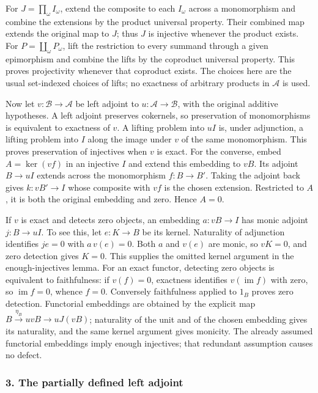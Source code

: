 \documentclass[11pt]{article}
\begin{document}
For \(J=\prod_\omega I_\omega\), extend the composite to each \(I_\omega\) across a monomorphism and combine the extensions by the product universal property. Their combined map extends the original map to \(J\); thus \(J\) is injective whenever the product exists. For \(P=\coprod_\omega P_\omega\), lift the restriction to every summand through a given epimorphism and combine the lifts by the coproduct universal property. This proves projectivity whenever that coproduct exists. The choices here are the usual set-indexed choices of lifts; no exactness of arbitrary products in \(\mathcal A\) is used.

Now let \(v:\mathcal B\to\mathcal A\) be left adjoint to \(u:\mathcal A\to\mathcal B\), with the original additive hypotheses. A left adjoint preserves cokernels, so preservation of monomorphisms is equivalent to exactness of \(v\). A lifting problem into \(uI\) is, under adjunction, a lifting problem into \(I\) along the image under \(v\) of the same monomorphism. This proves preservation of injectives when \(v\) is exact. For the converse, embed \(A=\ker(vf)\) in an injective \(I\) and extend this embedding to \(vB\). Its adjoint \(B\to uI\) extends across the monomorphism \(f:B\to B'\). Taking the adjoint back gives \(k:vB'\to I\) whose composite with \(vf\) is the chosen extension. Restricted to \(A\), it is both the original embedding and zero. Hence \(A=0\).

If \(v\) is exact and detects zero objects, an embedding \(a:vB\to I\) has monic adjoint \(j:B\to uI\). To see this, let \(e:K\to B\) be its kernel. Naturality of adjunction identifies \(je=0\) with \(a\,v(e)=0\). Both \(a\) and \(v(e)\) are monic, so \(vK=0\), and zero detection gives \(K=0\). This supplies the omitted kernel argument in the enough-injectives lemma. For an exact functor, detecting zero objects is equivalent to faithfulness: if \(v(f)=0\), exactness identifies \(v(\operatorname{im}f)\) with zero, so \(\operatorname{im}f=0\), whence \(f=0\). Conversely faithfulness applied to \(1_B\) proves zero detection. Functorial embeddings are obtained by the explicit map \(B\xrightarrow{\eta_B}uvB\to uJ(vB)\); naturality of the unit and of the chosen embedding gives its naturality, and the same kernel argument gives monicity. The already assumed functorial embeddings imply enough injectives; that redundant assumption causes no defect.

\subsubsection{3. The partially defined left adjoint}\label{the-partially-defined-left-adjoint}
\end{document}
